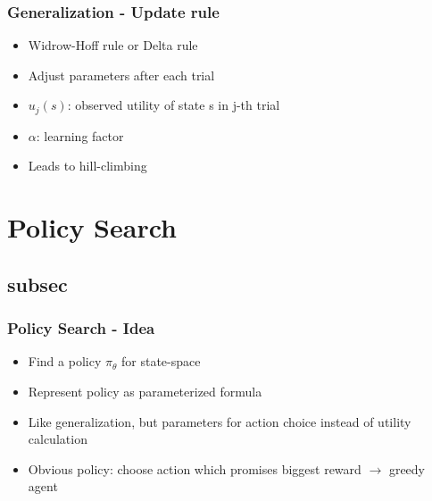 \begin{frame}
    \frametitle{Generalization - Update rule}
    \begin{itemize}
    	\item Widrow-Hoff rule or Delta rule
    	\item Adjust parameters after each trial
    \end{itemize}
    
	
    \begin{itemize}
    	\item $u_{j}(s)$: observed utility of state s in j-th trial
    	\item $\alpha$: learning factor
    	\item Leads to hill-climbing
    \end{itemize}
\end{frame}

\section{Policy Search} 
\subsection{subsec} %

\begin{frame}
    \frametitle{Policy Search - Idea}
    \begin{itemize}
    	\item Find a policy $\pi_{\theta}$ for state-space
    	\item Represent policy as parameterized formula
    	\item Like generalization, but parameters for action choice instead of utility calculation
    	\item Obvious policy: choose action which promises biggest reward $\rightarrow$ greedy agent
    \end{itemize}
\end{frame}

